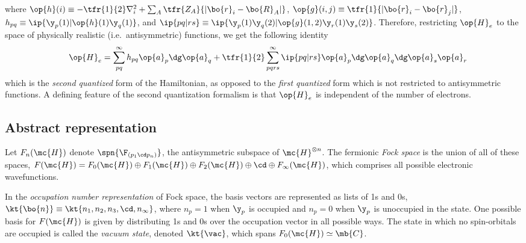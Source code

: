 \documentclass[11pt,fleqn]{article}
\numberwithin{equation}{section}
\begin{document}
\begin{rmk}
where $\op{h}(i)\equiv-\tfr{1}{2}\nabla_i^2+\sum_A\tfr{Z_A}{|\bo{r}_i-\bo{R}_A|}$, $\op{g}(i,j)\equiv\tfr{1}{|\bo{r}_i-\bo{r}_j|}$, $h_{pq}\equiv\ip{\y_p(1)|\op{h}(1)\y_q(1)}$, and $\ip{pq|rs}\equiv\ip{\y_p(1)\y_q(2)|\op{g}(1,2)\y_r(1)\y_s(2)}$.
Therefore, restricting $\op{H}_e$ to the space of physically realistic (i.e.~antisymmetric) functions, we get the following identity
\begin{align}\label{second-quantized-hamiltonian}
&&
  \op{H}_e
=
  \sum_{pq}^\infty
  h_{pq}
  \op{a}_p\dg \op{a}_q
+
  \tfr{1}{2}
  \sum_{pqrs}^\infty
  \ip{pq|rs}
  \op{a}_p\dg\op{a}_q\dg\op{a}_s\op{a}_r
\end{align}
which is the \textit{second quantized} form of the Hamiltonian, as opposed to the \textit{first quantized} form which is not restricted to antisymmetric functions.
A defining feature of the second quantization formalism is that $\op{H}_e$ is independent of the number of electrons.
\end{rmk}


\subsection{Abstract representation}

\begin{dfn}\label{fock-space}
Let $F_n(\mc{H})$ denote $\spn\{\F_{(p_1\cd p_n)}\}$, the antisymmetric subspace of $\mc{H}^{\otimes n}$.
The fermionic \textit{Fock space} is the union of all of these spaces, $F(\mc{H})=F_0(\mc{H})\oplus F_1(\mc{H})\oplus F_2(\mc{H})\oplus\cd\oplus F_{\infty}(\mc{H})$, which comprises all possible electronic wavefunctions.
\end{dfn}

\begin{dfn}\label{occupation-number-representation}
In the \textit{occupation number representation} of Fock space, the basis vectors are represented as lists of 1s and 0s,
$
  \kt{\bo{n}}
\equiv
  \kt{n_1,n_2,n_3,\cd,n_\infty}
$,
where $n_p=1$ when $\y_p$ is occupied and $n_p=0$ when $\y_p$ is unoccupied in the state.
One possible basis for $F(\mc{H})$ is given by distributing 1s and 0s over the occupation vector in all possible ways.
The state in which no spin-orbitals are occupied is called the \textit{vacuum state}, denoted $\kt{\vac}$, which spans $F_0(\mc{H})\simeq\mb{C}$.
\end{dfn}
\end{document}
